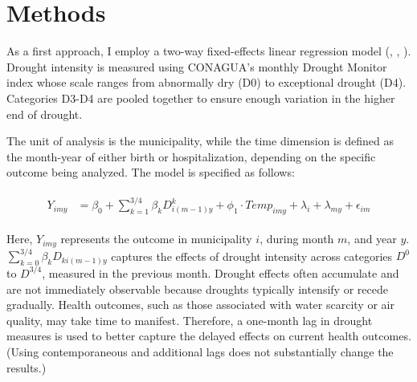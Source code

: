 \documentclass[12pt, oneside]{article}      %
\begin{document}
\section{Methods}

As a first approach, I employ a two-way fixed-effects linear regression model (\cite{Bailey2015}, \cite{Mullins2020}, \cite{Cohen2022}). Drought intensity is measured using CONAGUA's monthly Drought Monitor index whose scale ranges from abnormally dry (D0) to exceptional drought (D4). Categories D3-D4 are pooled together to ensure enough variation in the higher end of drought.

The unit of analysis is the municipality, while the time dimension is defined as the month-year of either birth or hospitalization, depending on the specific outcome being analyzed. The model is specified as follows:

\begin{align}
\begin{aligned}
Y_{imy} &= \beta_0 + \sum_{k=1}^{3/4} \beta_k D^k_{i(m-1)y} + \phi_1 \cdot Temp_{imy} + \lambda_i + \lambda_{my} + \epsilon_{im}
\end{aligned}
\label{eq:temp_regression}
\end{align}


Here, $Y_{imy}$ represents the outcome in municipality $i$, during month $m$, and year $y$.  $\sum_{k=0}^{3/4} \beta_k D_{ki(m-1)y}$ captures the effects of drought intensity across categories $D^0$ to $D^{3/4}$, measured in the previous month. Drought effects often accumulate and are not immediately observable because droughts typically intensify or recede gradually. Health outcomes, such as those associated with water scarcity or air quality, may take time to manifest. Therefore, a one-month lag in drought measures is used to better capture the delayed effects on current health outcomes. (Using contemporaneous and additional lags does not substantially change the results.)
\end{document}
